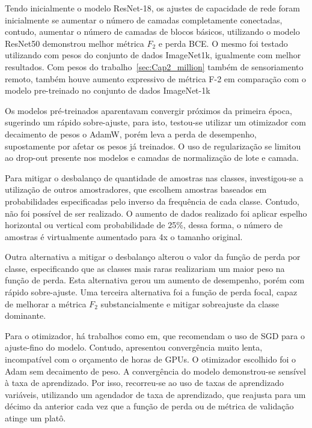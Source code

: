 Tendo inicialmente o modelo ResNet-18, os ajustes de capacidade de rede foram inicialmente se aumentar o número de camadas completamente conectadas, contudo, aumentar o número de camadas de blocos básicos, utilizando o modelo ResNet50 demonstrou melhor métrica $F_2$ e perda BCE. O mesmo foi testado utilizando com pesos do conjunto de dados ImageNet1k, igualmente com melhor resultados. Com pesos do trabalho~\ref{sec:Cap2_million} também de sensoriamento remoto, também houve aumento expressivo de métrica F-2 em comparação com o modelo pre-treinado no conjunto de dados ImageNet-1k

Os modelos pré-treinados aparentavam convergir próximos da primeira época, sugerindo um rápido sobre-ajuste, para isto, testou-se utilizar um otimizador com decaimento de pesos o AdamW, porém leva a perda de desempenho, supostamente por afetar os pesos já treinados. O uso de regularização se limitou ao drop-out presente nos modelos e camadas de normalização de lote e camada.

Para mitigar o desbalanço de quantidade de amostras nas classes, investigou-se a utilização de outros amostradores, que escolhem amostras baseados em probabilidades especificadas pelo inverso da frequência de cada classe. Contudo, não foi possível de ser realizado. O aumento de dados realizado foi aplicar espelho horizontal ou vertical com probabilidade de 25\%, dessa forma, o número de amostras é virtualmente aumentado para 4x o tamanho original.

Outra alternativa a mitigar o desbalanço alterou o valor da função de perda por classe, especificando que as classes mais raras realizariam um maior peso na função de perda. Esta alternativa gerou um aumento de desempenho, porém com rápido sobre-ajuste. Uma terceira alternativa foi a função de perda focal, capaz de melhorar a métrica $F_2$ substancialmente e mitigar sobreajuste da classe dominante.

Para o otimizador, há trabalhos como em\cite{https://doi.org/10.48550/arxiv.2106.10270}, que recomendam o uso de SGD para o ajuste-fino do modelo. Contudo, apresentou convergência muito lenta, incompatível com o orçamento de horas de GPUs. O otimizador escolhido foi o Adam sem decaimento de peso. A convergência do modelo demonstrou-se sensível à taxa de aprendizado. Por isso, recorreu-se ao uso de taxas de aprendizado variáveis, utilizando um agendador de taxa de aprendizado, que reajusta para um décimo da anterior cada vez que a função de perda ou de métrica de validação atinge um platô.


